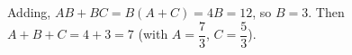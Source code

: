 Adding, $AB+BC=B(A+C)=4B=12$, so $B=3$. Then $A+B+C=4+3=\boxed{7}$ (with $A=\dfrac{7}{3}$, $C=\dfrac{5}{3}$).
